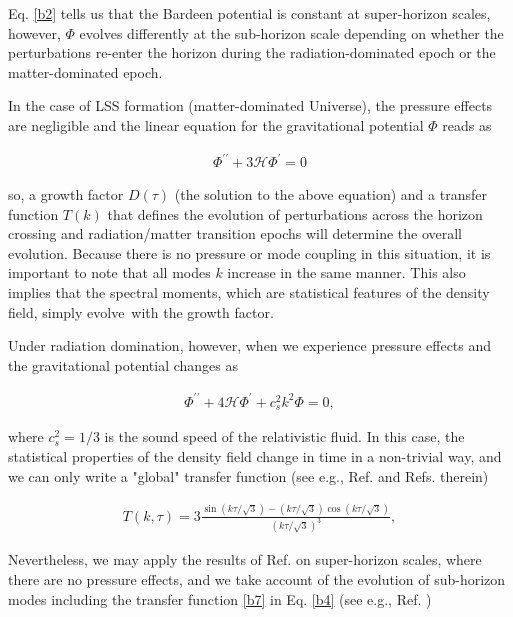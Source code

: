 \begin{appendices}
Eq. \ref{b2} tells us that the Bardeen potential is constant at super-horizon scales, however, $\Phi$ evolves differently at the sub-horizon scale depending on whether the perturbations re-enter the horizon during the radiation-dominated epoch or the matter-dominated epoch.

In the case of LSS formation (matter-dominated Universe), the pressure effects are negligible and the linear equation for the gravitational potential $\Phi$ reads as \cite{2000cils.book.....L}

\begin{align}
    \Phi^{\prime \prime}+3 \mathcal{H} \Phi^{\prime}=0
\end{align}

so, a growth factor $D(\tau)$ (the solution to the above equation) and a transfer function $T(k)$ that defines the evolution of perturbations across the horizon crossing and radiation/matter transition epochs will determine the overall evolution. Because there is no pressure or mode coupling in this situation, it is important to note that all modes $k$ increase in the same manner. This also implies that the spectral moments, which are statistical features of the density field, simply evolve with the growth factor.

Under radiation domination, however, when we experience pressure effects and the gravitational potential changes as

\begin{align}
    \Phi^{\prime \prime}+4 \mathcal{H} \Phi^{\prime}+c_{s}^{2} k^{2} \Phi=0,
\end{align}

where $c_{s}^{2}=1 / 3$ is the sound speed of the relativistic fluid. In this case, the statistical properties of the density field change in time in a non-trivial way, and we can only write a "global" transfer function (see e.g., Ref. \cite{Ando:2018qdb} and Refs. therein)

\begin{align}
    T(k, \tau)=3 \frac{\sin (k \tau / \sqrt{3})-(k \tau / \sqrt{3}) \cos (k \tau / \sqrt{3})}{(k \tau / \sqrt{3})^{3}}, \label{b7}
\end{align}

Nevertheless, we may apply the results of Ref. \cite{1986ApJ...304...15B} on super-horizon scales, where there are no pressure effects, and we take account of the evolution of sub-horizon modes including the transfer function \ref{b7} in Eq. \ref{b4} (see e.g., Ref. \cite{Ando:2018qdb})


\end{appendices}

